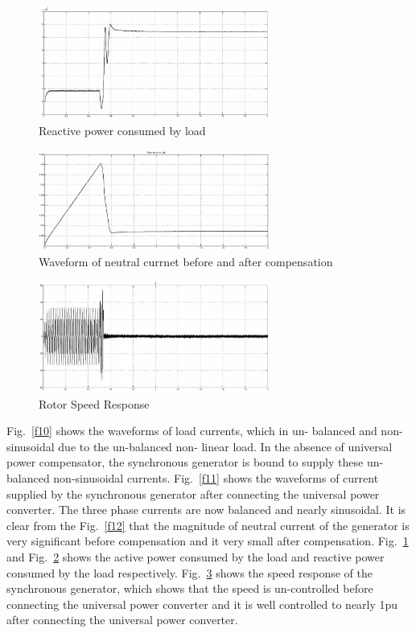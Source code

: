 \documentclass[journal,twoside]{IEEEtran}
\begin{document}
\begin{figure}[!ht]
\centering
\includegraphics[width=3in]{13}
\caption{Reactive power consumed by load}
\label{f13}
\end{figure}

\begin{figure}[!ht]
\centering
\includegraphics[width=3in]{14}
\caption{Waveform of neutral currnet before and after compensation}
\label{f14}
\end{figure}

\begin{figure}[!ht]
\centering
\includegraphics[width=3in]{15}
\caption{Rotor Speed Response}
\label{f15}
\end{figure}


\bigskip

Fig.~\ref{f10} shows the waveforms of load currents, which in un-
balanced and non-sinusoidal due to the un-balanced non-
linear load. In the absence of universal power compensator,
the synchronous generator is bound to supply these un-
balanced non-sinusoidal currents. Fig.~\ref{f11} shows the
waveforms of current supplied by the synchronous generator
after connecting the universal power converter. The three
phase currents are now balanced and nearly sinusoidal. It is clear from the Fig.~\ref{f12} that the magnitude of neutral current
of the generator is very significant before compensation and
it very small after compensation. Fig.~\ref{f13} and Fig.~\ref{f14} shows
the active power consumed by the load and reactive power
consumed by the load respectively. Fig.~\ref{f15} shows the speed
response of the synchronous generator, which shows that the
speed is un-controlled before connecting the universal power
converter and it is well controlled to nearly 1pu after
connecting the universal power converter.
\end{document}
